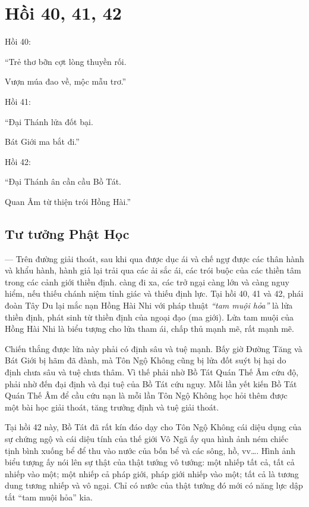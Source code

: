 \chapter{Hồi 40, 41, 42} %
\label{cha:hoi_40_41}

Hồi 40:

\begin{itshape}
``Trẻ thơ bỡn cợt lòng thuyền rối.

Vượn múa đao về, mộc mẫu trơ.''
\end{itshape}

Hồi 41:

\begin{itshape}
``Đại Thánh lửa đốt bại.

Bát Giới ma bắt đi.''
\end{itshape}

Hồi 42:

\begin{itshape}
``Đại Thánh ân cần cầu Bồ Tát.

Quan Âm từ thiện trói Hồng Hài.''
\end{itshape}

\section{Tư tưởng Phật Học} %
\label{sec:40_41_phat_hoc}

— Trên đường giải thoát, sau khi qua được dục ái và chế ngự được các thân hành và khẩu hành, hành giả lại trải qua các ải sắc ái, các trói buộc của các thiền tâm trong các cảnh giới thiền định. càng đi xa, các trở ngại càng lớn và càng nguy hiểm, nếu thiếu chánh niệm tỉnh giác và thiếu định lực. Tại hồi 40, 41 và 42, phái đoàn Tây Du lại mắc nạn Hồng Hài Nhi với pháp thuật \emph{``tam muội hỏa''} là lửa thiền định, phát sinh từ thiền định của ngoại đạo (ma giới). Lửa tam muội của Hồng Hài Nhi là biểu tượng cho lửa tham ái, chấp thủ mạnh mẽ, rất mạnh mẽ.

Chiến thắng được lửa này phải có định sâu và tuệ mạnh. Bấy giờ Đường Tăng và Bát Giới bị hãm đã đành, mà Tôn Ngộ Không cũng bị lửa đốt suýt bị hại do định chưa sâu và tuệ chưa thâm. Vì thế phải nhờ Bồ Tát Quán Thế Âm cứu độ, phải nhờ đến đại định và đại tuệ của Bồ Tát cứu nguy. Mỗi lần yết kiến Bồ Tát Quán Thế Âm để cầu cứu nạn là mỗi lần Tôn Ngộ Không học hỏi thêm được một bài học giải thoát, tăng trưởng định và tuệ giải thoát.

Tại hồi 42 này, Bồ Tát đã rất kín đáo dạy cho Tôn Ngộ Không cái diệu dụng của sự chứng ngộ và cái diệu tính của thế giới Vô Ngã ấy qua hình ảnh ném chiếc tịnh bình xuống bể để thu vào nước của bốn bể và các sông, hồ, vv\ldots. Hình ảnh biểu tượng ấy nói lên sự thật của thật tướng vô tướng: một nhiếp tất cả, tất cả nhiếp vào một; một nhiếp cả pháp giới, pháp giới nhiếp vào một; tất cả là tương dung tương nhiếp và vô ngại. Chỉ có nước của thật tướng đó mới có năng lực dập tắt ``tam muội hỏa'' kia.

